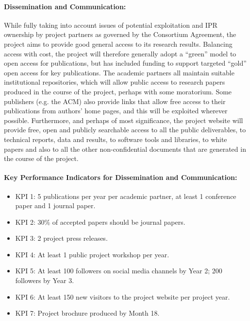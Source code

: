 \documentclass[a4paper,11pt]{article}
\begin{document}
\paragraph{Dissemination and Communication:}
While fully taking into account issues of potential exploitation and IPR ownership by project partners
as governed by the Consortium Agreement,
the project aims to provide good general access to its research results.
Balancing access with cost, the project will therefore generally adopt a ``green'' model to open access for publications,
but has included funding to support targeted ``gold'' open access for key publications.
The academic partners all maintain suitable institutional repositories, which will allow public access to research papers produced in the
course of the project, perhaps with some moratorium.  Some publishers (e.g. the ACM) also provide links that allow
free access to their publications from authors' home pages, and this will be exploited wherever possible.
%
Furthermore, and perhaps of most significance, the project website will provide free,
open and publicly searchable access to all the public deliverables, to technical reports, data and results, to software tools
and libraries, to white papers and also to all
the other non-confidential documents that are generated in the course of the project.  

\begin{mdframed}[backgroundcolor=blue!5]
\paragraph{Key Performance Indicators for Dissemination and Communication:}
\begin{itemize}
\item KPI 1: 5 publications per year per academic partner, at least 1 conference paper and 1 journal paper.
\item KPI 2: 30\% of accepted papers should be journal papers.
\item KPI 3: 2 project press releases.
\item KPI 4: At least 1 public project workshop per year.
\item KPI 5: At least 100 followers on social media channels by Year 2; 200 followers by Year 3.
\item KPI 6: At least 150 new visitors to the project website per project year.
\item KPI 7: Project brochure produced by Month 18.
\end{itemize}
\end{mdframed}
\end{document}
